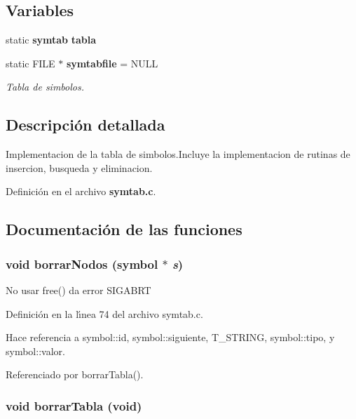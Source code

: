 \subsection*{Variables}
\begin{CompactItemize}
\item 
static {\bf symtab} {\bf tabla}
\item 
static FILE $\ast$ {\bf symtabfile} = NULL
\begin{CompactList}\small\item\em Tabla de simbolos. \item\end{CompactList}\end{CompactItemize}


\subsection{Descripci\'{o}n detallada}
Implementacion de la tabla de simbolos.Incluye la implementacion de rutinas de insercion, busqueda y eliminacion. 



Definici\'{o}n en el archivo {\bf symtab.c}.

\subsection{Documentaci\'{o}n de las funciones}
\subsubsection{\setlength{\rightskip}{0pt plus 5cm}void borrar\-Nodos ({\bf symbol} $\ast$ {\em s})}\label{symtab_8c_a4}


No usar free() da error SIGABRT 

Definici\'{o}n en la l\'{\i}nea 74 del archivo symtab.c.

Hace referencia a symbol::id, symbol::siguiente, T\_\-STRING, symbol::tipo, y symbol::valor.

Referenciado por borrar\-Tabla().
\subsubsection{\setlength{\rightskip}{0pt plus 5cm}void borrar\-Tabla (void)}\label{symtab_8c_a5}


